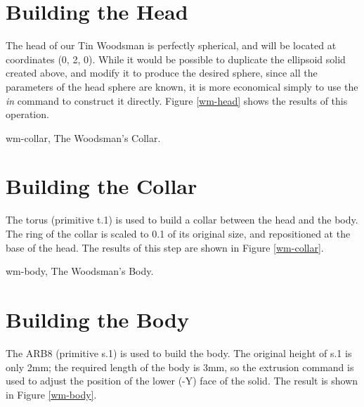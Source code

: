 \section{Building the Head}

The head of our Tin Woodsman is perfectly spherical, and will be located
at coordinates (0, 2, 0).
While it would be possible to duplicate the ellipsoid solid created above,
and modify it to produce the desired sphere, since all the parameters
of the head sphere are known, it is more economical simply to use
the {\em in} command to construct it directly.
Figure \ref{wm-head} shows the results of this operation.


\mfig wm-collar, The Woodsman's Collar.
\section{Building the Collar}

The torus (primitive t.1) is used to build a collar between the head and
the body.
The ring of the collar is scaled to 0.1 of its original size,
and repositioned at the base of the head.
The results of this step are shown in Figure \ref{wm-collar}.


\mfig wm-body, The Woodsman's Body.
\section{Building the Body}

The ARB8 (primitive s.1) is used to build the body.
The original height of s.1 is only 2mm;  the required
length of the body is 3mm, so the extrusion command is
used to adjust the position of the lower (-Y) face of the solid.
The result is shown in Figure \ref{wm-body}.

